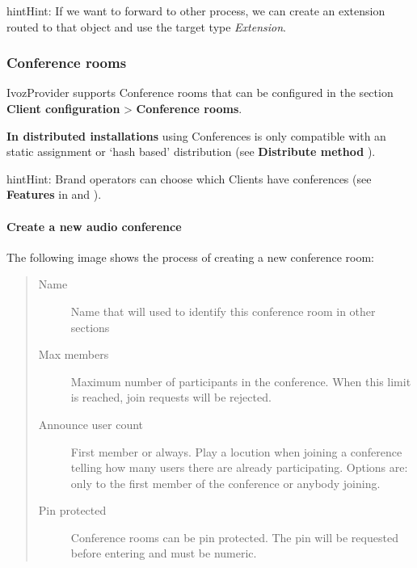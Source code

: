 \documentclass[letterpaper,10pt,english]{sphinxmanual}
\begin{document}
\begin{notice}{hint}{Hint:}
If we want to forward to other process, we can create an extension
routed to that object and use the target type \emph{Extension}.
\end{notice}


\subsubsection{Conference rooms}
\label{administration_portal/client/vpbx/routing_endpoints/conference_rooms::doc}\label{administration_portal/client/vpbx/routing_endpoints/conference_rooms:conference-rooms}\label{administration_portal/client/vpbx/routing_endpoints/conference_rooms:id1}
IvozProvider supports Conference rooms that can be configured in the section
\textbf{Client configuration} \textgreater{} \textbf{Conference rooms}.

\textbf{In distributed installations} using Conferences is only compatible with an static
assignment or `hash based' distribution (see \textbf{Distribute method} {\hyperref[administration_portal/brand/clients/virtual_pbx:virtual\string-pbx]{}}).

\begin{notice}{hint}{Hint:}
Brand operators can choose which Clients have conferences (see \textbf{Features}
in {\hyperref[getting_started/internal_calls/brand_portal:brand\string-configuration]{}} and {\hyperref[getting_started/internal_calls/client_portal:client\string-configuration]{}}).
\end{notice}
\paragraph{Create a new audio conference}

The following image shows the process of creating a new conference room:
\begin{quote}
\begin{description}
\item[{Name}] \leavevmode
Name that will used to identify this conference room in other sections

\item[{Max members}] \leavevmode
Maximum number of participants in the conference. When this limit is
reached, join requests will be rejected.

\item[{Announce user count}] \leavevmode
First member or always.
Play a locution when joining a conference telling how many users there
are already participating. Options are: only to the first member of the
conference or anybody joining.

\item[{Pin protected}] \leavevmode
Conference rooms can be pin protected. The pin will be requested before
entering and must be numeric.

\end{description}
\end{quote}
\end{document}
